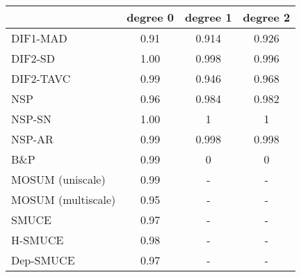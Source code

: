 \begin{tabular}{|l|c|c|c|}
  \hline
 & degree 0 & degree 1 & degree 2 \\ 
  \hline
DIF1-MAD & 0.91 & 0.914 & 0.926 \\ 
  DIF2-SD & 1.00 & 0.998 & 0.996 \\ 
  DIF2-TAVC & 0.99 & 0.946 & 0.968 \\ 
  NSP & 0.96 & 0.984 & 0.982 \\ 
  NSP-SN & 1.00 & 1 & 1 \\ 
  NSP-AR & 0.99 & 0.998 & 0.998 \\ 
  B\&P & 0.99 & 0 & 0 \\ 
  MOSUM (uniscale) & 0.99 & - & - \\ 
  MOSUM (multiscale) & 0.95 & - & - \\ 
  SMUCE & 0.97 & - & - \\ 
  H-SMUCE & 0.98 & - & - \\ 
  Dep-SMUCE & 0.97 & - & - \\ 
   \hline
\end{tabular}
